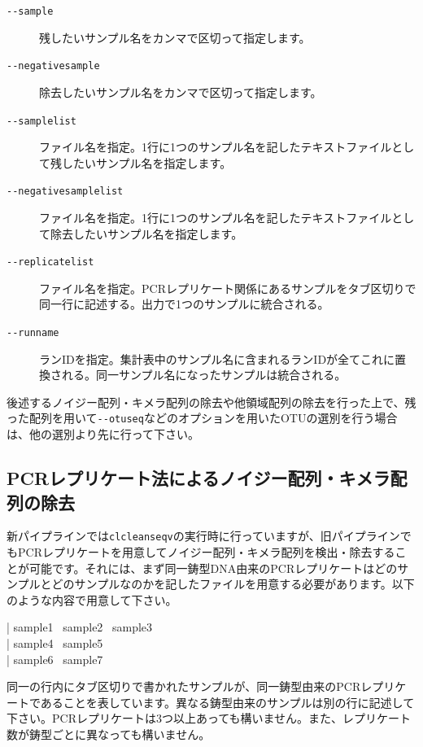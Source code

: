 \documentclass[titlepage,10pt,a4paper]{jsbook}
\newenvironment{content}{\begin{shaded}\vspace{-1em}\raggedright\ttfamily\footnotesize\setlength{\baselineskip}{1.4em}}{\end{shaded}\vspace{-1em}}
\begin{document}
\begin{description}
\item[\texttt{{-}{-}sample}] 残したいサンプル名をカンマで区切って指定します。
\item[\texttt{{-}{-}negativesample}] 除去したいサンプル名をカンマで区切って指定します。
\item[\texttt{{-}{-}samplelist}] ファイル名を指定。1行に1つのサンプル名を記したテキストファイルとして残したいサンプル名を指定します。
\item[\texttt{{-}{-}negativesamplelist}] ファイル名を指定。1行に1つのサンプル名を記したテキストファイルとして除去したいサンプル名を指定します。
\item[\texttt{{-}{-}replicatelist}] ファイル名を指定。PCRレプリケート関係にあるサンプルをタブ区切りで同一行に記述する。出力で1つのサンプルに統合される。
\item[\texttt{{-}{-}runname}] ランIDを指定。集計表中のサンプル名に含まれるランIDが全てこれに置換される。同一サンプル名になったサンプルは統合される。
\end{description}

後述するノイジー配列・キメラ配列の除去や他領域配列の除去を行った上で、残った配列を用いて\texttt{{-}{-}otuseq}などのオプションを用いたOTUの選別を行う場合は、他の選別より先に行って下さい。

\subsection{PCRレプリケート法によるノイジー配列・キメラ配列の除去}

新パイプラインでは\texttt{clcleanseqv}の実行時に行っていますが、旧パイプラインでもPCRレプリケートを用意してノイジー配列・キメラ配列を検出・除去することが可能です。それには、まず同一鋳型DNA由来のPCRレプリケートはどのサンプルとどのサンプルなのかを記したファイルを用意する必要があります。以下のような内容で用意して下さい。
\begin{content}
| sample1~ sample2~ sample3\\
| sample4~ sample5\\
| sample6~ sample7
\end{content}
同一の行内にタブ区切りで書かれたサンプルが、同一鋳型由来のPCRレプリケートであることを表しています。異なる鋳型由来のサンプルは別の行に記述して下さい。PCRレプリケートは3つ以上あっても構いません。また、レプリケート数が鋳型ごとに異なっても構いません。
\end{document}
